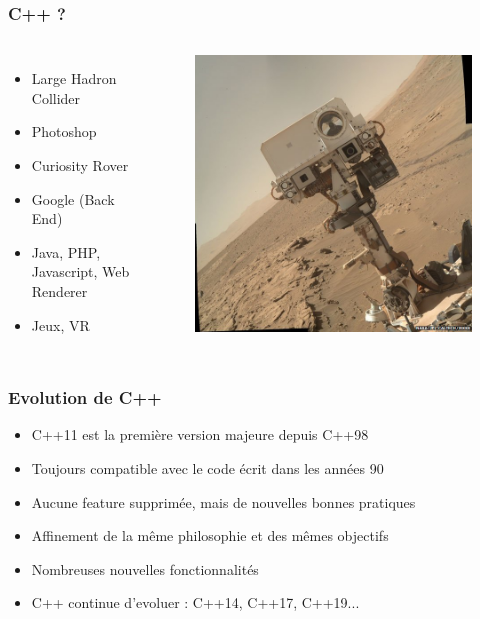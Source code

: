\documentclass[xetex,mathserif]{beamer}
\begin{document}
\begin{frame}
\frametitle{C++ ?}
\begin{columns}[T]
 \begin{itemize}
	 \item Large Hadron Collider
	 \item Photoshop
	 \item Curiosity Rover
	 \item Google (Back End)
	 \item Java, PHP, Javascript, Web Renderer
	 \item Jeux, VR
\end{itemize}
\begin{figure}
	\includegraphics[width=1\textwidth]{curiosity.jpg}
\end{figure}
\end{columns}
\end{frame}

\begin{frame}
\frametitle{Evolution de C++}
\begin{itemize}
	 \item C++11 est la première version majeure depuis C++98
	 \item Toujours compatible avec le code écrit dans les années 90
	 \item Aucune feature supprimée, mais de nouvelles bonnes pratiques
	 \item Affinement de la même philosophie et des mêmes objectifs
	 \item Nombreuses nouvelles fonctionnalités
	 \item C++ continue d'evoluer : C++14, C++17, C++19...
\end{itemize}
\end{frame}
\end{document}

